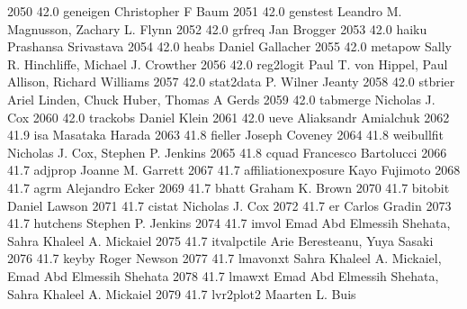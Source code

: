   2050     42.0    geneigen      Christopher F Baum                      
  2051     42.0    genstest      Leandro M. Magnusson, Zachary L. Flynn  
  2052     42.0    grfreq        Jan Brogger                             
  2053     42.0    haiku         Prashansa Srivastava                    
  2054     42.0    heabs         Daniel Gallacher                        
  2055     42.0    metapow       Sally R. Hinchliffe, Michael J. Crowther
  2056     42.0    reg2logit     Paul T. von Hippel, Paul Allison,       
                                   Richard Williams                        
  2057     42.0    stat2data     P. Wilner Jeanty                        
  2058     42.0    stbrier       Ariel Linden, Chuck Huber, Thomas A     
                                   Gerds                                   
  2059     42.0    tabmerge      Nicholas J. Cox                         
  2060     42.0    trackobs      Daniel Klein                            
  2061     42.0    ueve          Aliaksandr Amialchuk                    
  2062     41.9    isa           Masataka Harada                         
  2063     41.8    fieller       Joseph Coveney                          
  2064     41.8    weibullfit    Nicholas J. Cox, Stephen P. Jenkins     
  2065     41.8    cquad         Francesco Bartolucci                    
  2066     41.7    adjprop       Joanne M. Garrett                       
  2067     41.7    affiliationexposure  Kayo Fujimoto                           
  2068     41.7    agrm          Alejandro Ecker                         
  2069     41.7    bhatt         Graham K. Brown                         
  2070     41.7    bitobit       Daniel Lawson                           
  2071     41.7    cistat        Nicholas J. Cox                         
  2072     41.7    er            Carlos Gradin                           
  2073     41.7    hutchens      Stephen P. Jenkins                      
  2074     41.7    imvol         Emad Abd Elmessih Shehata, Sahra        
                                   Khaleel A. Mickaiel                     
  2075     41.7    itvalpctile   Arie Beresteanu, Yuya Sasaki            
  2076     41.7    keyby         Roger Newson                            
  2077     41.7    lmavonxt      Sahra Khaleel A. Mickaiel, Emad Abd     
                                   Elmessih Shehata                        
  2078     41.7    lmawxt        Emad Abd Elmessih Shehata, Sahra        
                                   Khaleel A. Mickaiel                     
  2079     41.7    lvr2plot2     Maarten L. Buis                         
